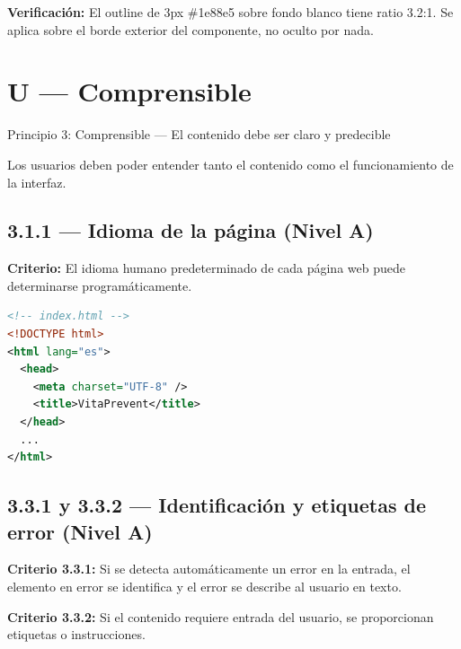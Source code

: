 \documentclass[12pt, a4paper]{article}
\begin{document}
\textbf{Verificación:} El outline de 3px \#1e88e5 sobre fondo blanco tiene ratio 3.2:1. Se aplica sobre el borde exterior del componente, no oculto por nada.

\section{U --- Comprensible}

\begin{princbox}[purplemod]{Principio 3: Comprensible --- El contenido debe ser claro y predecible}

Los usuarios deben poder entender tanto el contenido como el funcionamiento de la interfaz.
\end{princbox}

\subsection{3.1.1 --- Idioma de la página (Nivel A)}

\textbf{Criterio:} El idioma humano predeterminado de cada página web puede determinarse programáticamente.

\begin{evidbox}
\begin{lstlisting}[language=XML]
<!-- index.html -->
<!DOCTYPE html>
<html lang="es">
  <head>
    <meta charset="UTF-8" />
    <title>VitaPrevent</title>
  </head>
  ...
</html>
\end{lstlisting}
\end{evidbox}

\subsection{3.3.1 y 3.3.2 --- Identificación y etiquetas de error (Nivel A)}

\textbf{Criterio 3.3.1:} Si se detecta automáticamente un error en la entrada, el elemento en error se identifica y el error se describe al usuario en texto.

\textbf{Criterio 3.3.2:} Si el contenido requiere entrada del usuario, se proporcionan etiquetas o instrucciones.
\end{document}
